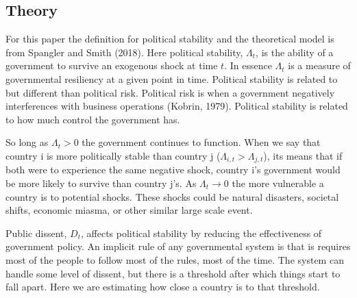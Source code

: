 \documentclass[12pt]{article}
\begin{document}
\begin{spacing}{1.5}
  
\section*{Theory}

For this paper the definition for political stability and the theoretical model is from Spangler and Smith (2018). Here political stability, $\Lambda_t$, is the ability of a government to survive an exogenous shock at time $t$. In essence $\Lambda_t$ is a measure of governmental resiliency at a given point in time. Political stability is related to but different than political risk. Political risk is when a government negatively interferences with business operations (Kobrin, 1979). Political stability is related to how much control the government has.  

So long as $\Lambda_t>0$ the government continues to function. When we say that country i is more politically stable than country j ($\Lambda_{i,t} > \Lambda_{j,t}$), its means that if both were to experience the same negative shock, country i's government would be more likely to survive than country j's. As $\Lambda_t\rightarrow 0$ the more vulnerable a country is to potential shocks. These shocks could be natural disasters, societal shifts, economic miasma, or other similar large scale event. 

Public dissent, $D_t$, affects political stability by reducing the effectiveness of government policy. An implicit rule of any governmental system is that is requires most of the people to follow most of the rules, most of the time. The system can handle some level of dissent, but there is a threshold after which things start to fall apart. Here we are estimating how close a country is to that threshold.   
 







\end{spacing}
\end{document}

